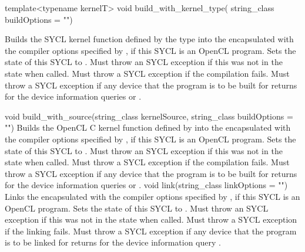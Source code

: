   \addRowThreeL
    {template<typename kernelT>}
    {void build_with_kernel_type(}
    {string_class buildOptions = "")}
    {
      Builds the SYCL kernel function defined by the type  into the encapsulated  with the compiler options specified by , if this SYCL  is an OpenCL program. Sets the state of this SYCL  to . Must throw an  SYCL exception if this  was not in the  state when called. Must throw a   SYCL exception if the compilation fails.  Must throw a  SYCL exception if any device that the program is to be built for returns  for the device information queries  or .

    }
  \addRowTwoL
    {void build_with_source(string_class kernelSource, }
    {string_class buildOptions = "")}
    {
      Builds the OpenCL C kernel function defined by  into the encapsulated  with the compiler options specified by , if this SYCL  is an OpenCL program. Sets the state of this SYCL  to . Must throw an  SYCL exception if this  was not in the  state when called. Must throw a   SYCL exception if the compilation fails.  Must throw a  SYCL exception if any device that the program is to be built for returns  for the device information queries  or .
    }
  \addRow
    {void link(string_class linkOptions = "")}
    {
      Links the encapsulated  with the compiler options specified by , if this SYCL  is an OpenCL program. Sets the state of this SYCL  to . Must throw an  SYCL exception if this  was not in the  state when called. Must throw a  SYCL exception if the linking fails.  Must throw a  SYCL exception if any device that the program is to be linked for returns  for the device information query .
    }
